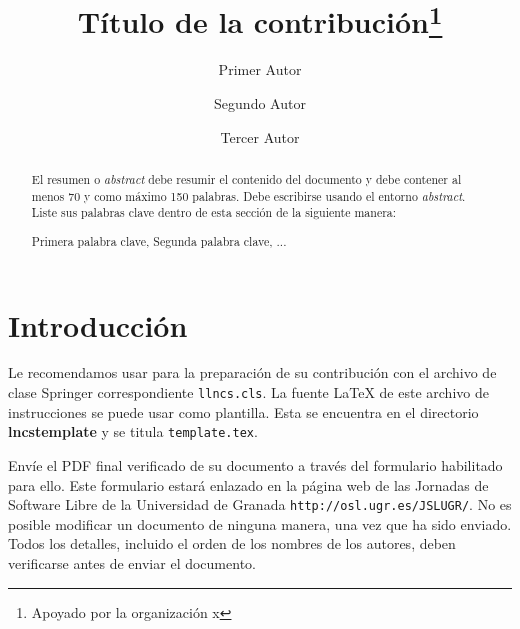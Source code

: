 \documentclass[runningheads,a4paper]{llncs}
\newcommand{\keywords}[1]{\par\addvspace\baselineskip\noindent
\keywordname\enspace\ignorespaces#1}
\begin{document}
\title{Título de la contribución\thanks{Apoyado por la organización x}}



\author{Primer Autor \and Segundo Autor \and
Tercer Autor\\}



\maketitle	%

\begin{abstract}
El resumen o \textit{abstract} debe resumir el contenido del documento y debe contener al menos 70 y como máximo 150 palabras. Debe escribirse usando el entorno \emph{abstract}. Liste sus palabras clave dentro de esta sección de la siguiente manera:

\keywords{Primera palabra clave, Segunda palabra clave, ...}

\end{abstract}

\section{Introducci\'{o}n}
Le recomendamos usar \LaTeXe{} para la preparación de su contribución con el archivo de clase Springer correspondiente \verb+llncs.cls+. La fuente \LaTeX{} de este archivo de instrucciones se puede usar como plantilla. Esta se encuentra en el directorio \textbf{lncstemplate} y se titula \texttt{template.tex}.

Envíe el PDF final verificado de su documento a través del formulario habilitado para ello. Este formulario estará enlazado en la página web de las Jornadas de Software Libre de la Universidad de Granada \texttt{http://osl.ugr.es/JSLUGR/}. No es posible modificar un documento de ninguna manera, una vez que ha sido enviado. Todos los detalles, incluido el orden de los nombres de los autores, deben verificarse antes de enviar el documento.
\end{document}
